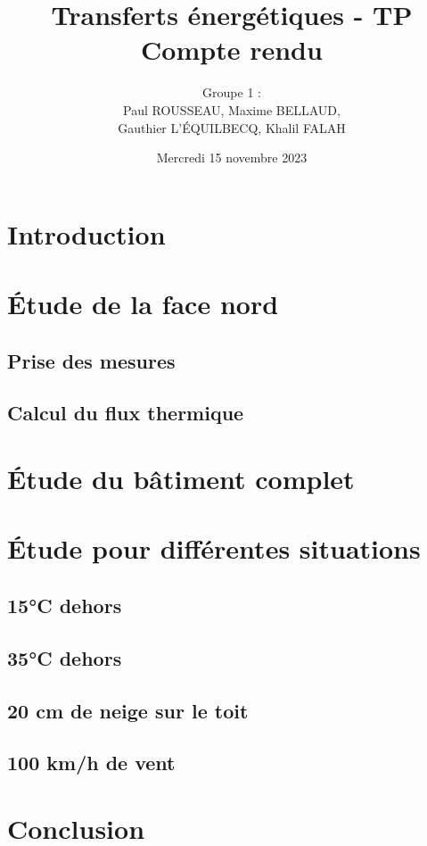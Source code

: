 \documentclass[12pt, a4paper]{article}
\title{Transferts énergétiques - TP \\
Compte rendu}
\author{Groupe 1 : \\
Paul ROUSSEAU, Maxime BELLAUD, \\
Gauthier L'ÉQUILBECQ, Khalil FALAH}
\date{Mercredi 15 novembre 2023}
\begin{document}
\maketitle

\tableofcontents

\section{Introduction}

\section{Étude de la face nord}

\subsection{Prise des mesures}

\subsection{Calcul du flux thermique}

\section{Étude du bâtiment complet}

\section{Étude pour différentes situations}
\subsection{15°C dehors}

\subsection{35°C dehors}

\subsection{20 cm de neige sur le toit}

\subsection{100 km/h de vent}

\section{Conclusion}
\end{document}
